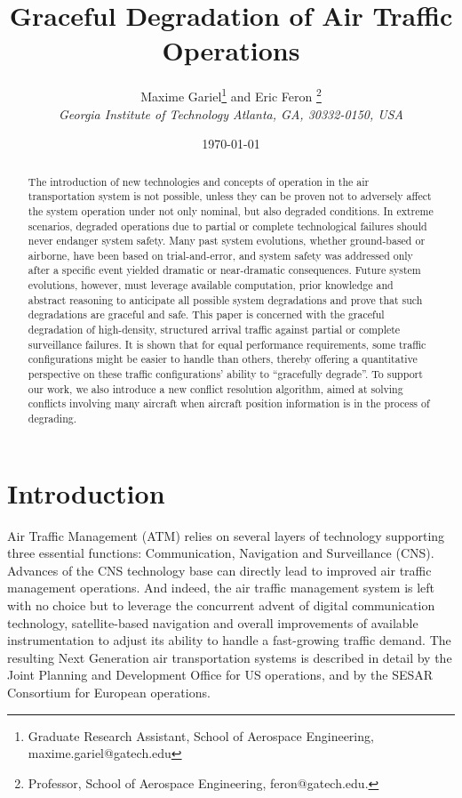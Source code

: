 \documentclass[a4paper, 10pt]{IEEEtran}
\begin{document}
\title{Graceful Degradation of Air Traffic Operations}
\author{
  Maxime Gariel\thanks{Graduate Research Assistant, School of Aerospace Engineering,
    maxime.gariel@gatech.edu} and
  Eric Feron  \thanks{ Professor, School of Aerospace
  Engineering, feron@gatech.edu.}\\
  {\normalsize\itshape
   Georgia Institute of Technology Atlanta, GA, 30332-0150, USA}\\
 }

\date{\today}
\maketitle



\begin{abstract} The introduction of new technologies and concepts of operation in
the air transportation system
is not possible, unless they can be proven not to adversely affect the
system operation under not only nominal, but also degraded conditions. In
extreme scenarios, degraded operations due to partial or complete
technological failures should never endanger system safety. Many past
system evolutions, whether ground-based or airborne, have been based on
trial-and-error, and system safety was addressed only after a specific
event yielded dramatic or near-dramatic consequences. Future system
evolutions, however, must leverage available computation, prior knowledge
and abstract reasoning to anticipate all possible system degradations and
prove that such degradations are graceful and safe. This paper is concerned
with the graceful degradation of high-density, structured arrival traffic
against partial or complete surveillance failures. It is shown that for
equal performance requirements, some traffic configurations might be easier
to handle than others, thereby offering a quantitative perspective on these
traffic configurations' ability to ``gracefully degrade''. To support our
work, we also introduce a new conflict resolution algorithm, aimed at
solving conflicts involving many aircraft when aircraft position information is in
the process of degrading.
\end{abstract}



 \section{Introduction}

Air Traffic Management (ATM) relies on several layers of technology
supporting three essential functions: Communication, Navigation and
Surveillance (CNS). Advances of the CNS technology base can directly lead
to improved air traffic management operations. And indeed,
the air traffic management system is left with no choice but to leverage
the concurrent advent of digital communication technology, satellite-based
navigation and overall improvements of available instrumentation to adjust
its ability to handle a fast-growing traffic demand.
The resulting Next Generation air transportation systems is described in
detail by the Joint Planning and Development Office \cite{nextGen} for US
operations, and by the {SESAR Consortium} \cite{SESARdeliverable3, SESARconceptOfOperation} for European
operations. 
\end{document}
